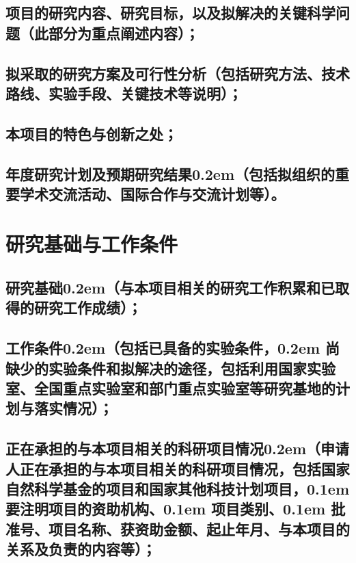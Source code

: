 \documentclass[YF]{nsfc}
\begin{document}






\section{\textbf{项目的研究内容、研究目标，以及拟解决的关键科学问题}（此部分为重点阐述内容）\textbf{；}}

\section{\textbf{拟采取的研究方案及可行性分析}（包括研究方法、技术路线、实验手段、关键技术等说明）；}

\section{\textbf{本项目的特色与创新之处；}}

\section{\textbf{年度研究计划及预期研究结果}\kern0.2em（包括拟组织的重要学术交流活动、国际合作与交流计划等）。}

\chapter{\textbf{研究基础与工作条件}}
\section{\textbf{研究基础}\kern0.2em（与本项目相关的研究工作积累和已取得的研究工作成绩）；}

\section{\textbf{工作条件}\kern0.2em（包括已具备的实验条件，\kern0.2em 尚缺少的实验条件和拟解决的途径，包括利用国家实验室、全国重点实验室和部门重点实验室等研究基地的计划与落实情况）；}

\section{\textbf{正在承担的与本项目相关的科研项目情况}\kern0.2em（申请人正在承担的与本项目相关的科研项目情况，包括国家自然科学基金的项目和国家其他科技计划项目，\kern0.1em 要注明项目的资助机构、\kern0.1em 项目类别、\kern0.1em 批准号、项目名称、获资助金额、起止年月、与本项目的关系及负责的内容等）；\!\!\!}
\end{document}
